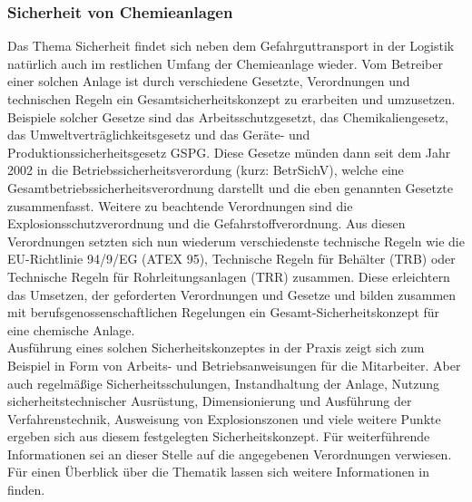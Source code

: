 \subsubsection{Sicherheit von Chemieanlagen}
Das Thema Sicherheit findet sich neben dem Gefahrguttransport in der Logistik natürlich auch im restlichen Umfang der Chemieanlage wieder. 
Vom Betreiber einer solchen Anlage ist durch verschiedene Gesetzte, Verordnungen und technischen Regeln ein Gesamtsicherheitskonzept zu erarbeiten und umzusetzen. Beispiele solcher Gesetze sind das Arbeitsschutzgesetzt, das Chemikaliengesetz, das Umweltverträglichkeitsgesetz und das Geräte- und Produktionssicherheitsgesetz GSPG. \linebreak 
Diese Gesetze münden dann seit dem Jahr 2002 in die Betriebssicherheitsverordung (kurz: BetrSichV), welche eine Gesamtbetriebssicherheitsverordnung darstellt und die eben genannten Gesetzte zusammenfasst. Weitere zu beachtende Verordnungen sind die Explosionsschutzverordnung und die Gefahrstoffverordnung.\linebreak
Aus diesen Verordnungen setzten sich nun wiederum verschiedenste technische Regeln wie die EU-Richtlinie 94/9/EG (ATEX 95), Technische Regeln für Behälter (TRB) oder Technische Regeln für Rohrleitungsanlagen (TRR) zusammen. Diese erleichtern das Umsetzen, der geforderten Verordnungen und Gesetze und bilden zusammen mit berufsgenossenschaftlichen Regelungen ein Gesamt-Sicherheitskonzept für eine chemische Anlage. \cite{Ignatowitz.2015}\\
Ausführung eines solchen Sicherheitskonzeptes in der Praxis zeigt sich zum Beispiel in Form von Arbeits- und Betriebsanweisungen für die Mitarbeiter. Aber auch regelmäßige Sicherheitsschulungen, Instandhaltung der Anlage, Nutzung sicherheitstechnischer Ausrüstung, Dimensionierung und Ausführung der Verfahrenstechnik, Ausweisung von Explosionszonen und viele weitere Punkte ergeben sich aus diesem festgelegten Sicherheitskonzept. Für weiterführende Informationen sei an dieser Stelle auf die angegebenen Verordnungen verwiesen. Für einen Überblick über die Thematik lassen sich weitere Informationen in \cite{Ignatowitz.2015} finden.

